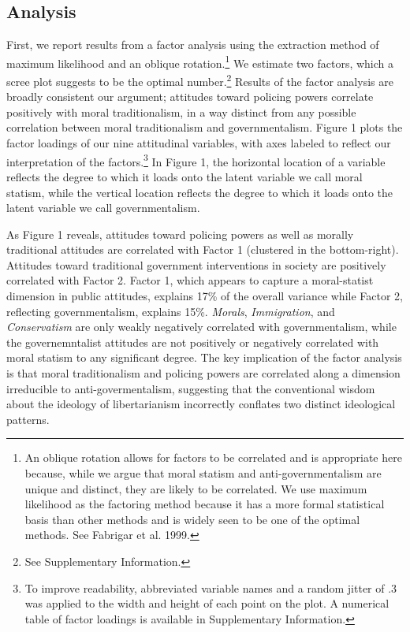 \documentclass[12pt,]{article}
\begin{document}
\subsection{Analysis}\label{analysis}

First, we report results from a factor analysis using the extraction
method of maximum likelihood and an oblique rotation.\footnote{An
  oblique rotation allows for factors to be correlated and is
  appropriate here because, while we argue that moral statism and
  anti-governmentalism are unique and distinct, they are likely to be
  correlated. We use maximum likelihood as the factoring method because
  it has a more formal statistical basis than other methods and is
  widely seen to be one of the optimal methods. See Fabrigar et al.
  1999.} We estimate two factors, which a scree plot suggests to be the
optimal number.\footnote{See Supplementary Information.} Results of the
factor analysis are broadly consistent our argument; attitudes toward
policing powers correlate positively with moral traditionalism, in a way
distinct from any possible correlation between moral traditionalism and
governmentalism. Figure 1 plots the factor loadings of our nine
attitudinal variables, with axes labeled to reflect our interpretation
of the
factors.\footnote{To improve readability, abbreviated variable names and a random jitter of .3 was applied to the width and height of each point on the plot. A numerical table of factor loadings is available in Supplementary Information.}
In Figure 1, the horizontal location of a variable reflects the degree
to which it loads onto the latent variable we call moral statism, while
the vertical location reflects the degree to which it loads onto the
latent variable we call governmentalism.

As Figure 1 reveals, attitudes toward policing powers as well as morally
traditional attitudes are correlated with Factor 1 (clustered in the
bottom-right). Attitudes toward traditional government interventions in
society are positively correlated with Factor 2. Factor 1, which appears
to capture a moral-statist dimension in public attitudes, explains 17\%
of the overall variance while Factor 2, reflecting governmentalism,
explains 15\%. \emph{Morals}, \emph{Immigration}, and
\emph{Conservatism} are only weakly negatively correlated with
governmentalism, while the governemntalist attitudes are not positively
or negatively correlated with moral statism to any significant degree.
The key implication of the factor analysis is that moral traditionalism
and policing powers are correlated along a dimension irreducible to
anti-govermentalism, suggesting that the conventional wisdom about the
ideology of libertarianism incorrectly conflates two distinct
ideological patterns.
\end{document}
